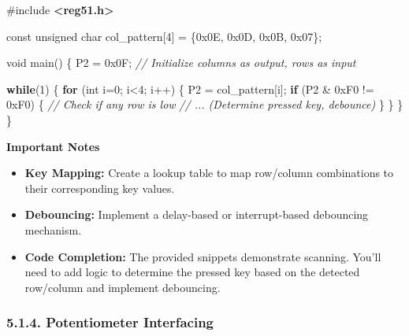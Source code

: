 \documentclass[
]{article}
\newenvironment{Shaded}{}{}
\newcommand{\BaseNTok}[1]{\textcolor[rgb]{0.25,0.63,0.44}{#1}}
\newcommand{\CommentTok}[1]{\textcolor[rgb]{0.38,0.63,0.69}{\textit{#1}}}
\newcommand{\ControlFlowTok}[1]{\textcolor[rgb]{0.00,0.44,0.13}{\textbf{#1}}}
\newcommand{\DataTypeTok}[1]{\textcolor[rgb]{0.56,0.13,0.00}{#1}}
\newcommand{\DecValTok}[1]{\textcolor[rgb]{0.25,0.63,0.44}{#1}}
\newcommand{\ImportTok}[1]{\textcolor[rgb]{0.00,0.50,0.00}{\textbf{#1}}}
\newcommand{\NormalTok}[1]{#1}
\newcommand{\OperatorTok}[1]{\textcolor[rgb]{0.40,0.40,0.40}{#1}}
\newcommand{\PreprocessorTok}[1]{\textcolor[rgb]{0.74,0.48,0.00}{#1}}
\begin{document}
\begin{Shaded}
\begin{Highlighting}[]
\PreprocessorTok{\#include }\ImportTok{\textless{}reg51.h\textgreater{}}

\DataTypeTok{const} \DataTypeTok{unsigned} \DataTypeTok{char}\NormalTok{ col\_pattern}\OperatorTok{[}\DecValTok{4}\OperatorTok{]} \OperatorTok{=} \OperatorTok{\{}\BaseNTok{0x0E}\OperatorTok{,} \BaseNTok{0x0D}\OperatorTok{,} \BaseNTok{0x0B}\OperatorTok{,} \BaseNTok{0x07}\OperatorTok{\};}

\DataTypeTok{void}\NormalTok{ main}\OperatorTok{()} \OperatorTok{\{}
\NormalTok{    P2 }\OperatorTok{=} \BaseNTok{0x0F}\OperatorTok{;}  \CommentTok{// Initialize columns as output, rows as input}

    \ControlFlowTok{while}\OperatorTok{(}\DecValTok{1}\OperatorTok{)} \OperatorTok{\{}
        \ControlFlowTok{for} \OperatorTok{(}\DataTypeTok{int}\NormalTok{ i}\OperatorTok{=}\DecValTok{0}\OperatorTok{;}\NormalTok{ i}\OperatorTok{\textless{}}\DecValTok{4}\OperatorTok{;}\NormalTok{ i}\OperatorTok{++)} \OperatorTok{\{}
\NormalTok{            P2 }\OperatorTok{=}\NormalTok{ col\_pattern}\OperatorTok{[}\NormalTok{i}\OperatorTok{];}
            \ControlFlowTok{if} \OperatorTok{(}\NormalTok{P2 }\OperatorTok{\&} \BaseNTok{0xF0} \OperatorTok{!=} \BaseNTok{0xF0}\OperatorTok{)} \OperatorTok{\{} \CommentTok{// Check if any row is low}
                \CommentTok{// ... (Determine pressed key, debounce)}
            \OperatorTok{\}}
        \OperatorTok{\}}
    \OperatorTok{\}}
\OperatorTok{\}}
\end{Highlighting}
\end{Shaded}

\textbf{Important Notes}

\begin{itemize}
\item
  \textbf{Key Mapping:} Create a lookup table to map row/column
  combinations to their corresponding key values.
\item
  \textbf{Debouncing:} Implement a delay-based or interrupt-based
  debouncing mechanism.
\item
  \textbf{Code Completion:} The provided snippets demonstrate scanning.
  You'll need to add logic to determine the pressed key based on the
  detected row/column and implement debouncing.
\end{itemize}

\hypertarget{514-potentiometer-interfacing}{%
\subsubsection{5.1.4. Potentiometer
Interfacing}\label{514-potentiometer-interfacing}}
\end{document}
